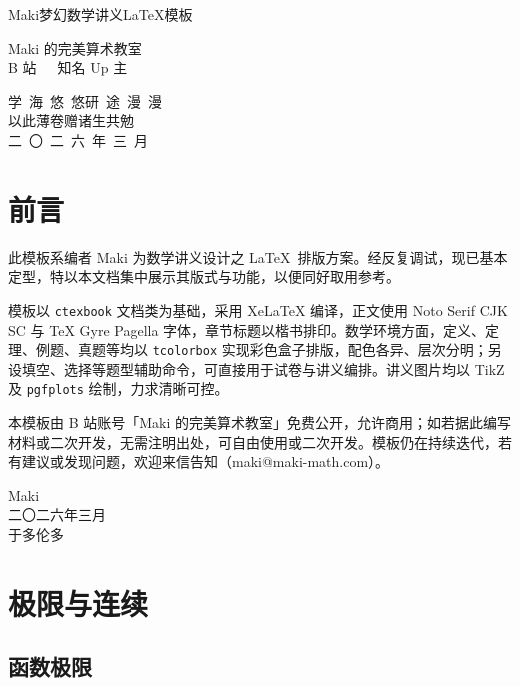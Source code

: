 \documentclass[a4paper,12pt,oneside,fontset=none]{ctexbook}
\newcommand{\MakeTitlePage}{%
    \begin{titlepage}
        \centering
        \vspace*{5cm}
        
        {\fontsize{48pt}{60pt}\selectfont\heavykaishu \color{LogicColor} Maki梦幻数学讲义LaTeX模板\par}
        
        \vfill
        
        {\LARGE \kaishu 
        Maki 的完美算术教室
        \\[0.8em]
        \Large
        B 站\ \ \ 知名 Up 主
        \\
        }
    
        \vspace{2.3cm}
        
        {\Large \kaishu
        学\ 海\ 悠\ 悠\quad 研\ 途\ 漫\ 漫
        \\[0.3em]
        {\Large 以此薄卷赠诸生共勉}
        \\[2.5em]
        
        二\ 〇\ 二\ 六\ 年\ 三\ 月 
        }
        
        \vspace{2cm}
    \end{titlepage}%
}
\numberwithin{equation}{chapter}
\begin{document}
\frontmatter

\MakeTitlePage



\chapter*{前言}
此模板系编者 Maki 为数学讲义设计之 \LaTeX\ 排版方案。经反复调试，现已基本定型，特以本文档集中展示其版式与功能，以便同好取用参考。

模板以 \texttt{ctexbook} 文档类为基础，采用 XeLaTeX 编译，正文使用 Noto Serif CJK SC 与 TeX Gyre Pagella 字体，章节标题以楷书排印。数学环境方面，定义、定理、例题、真题等均以 \texttt{tcolorbox} 实现彩色盒子排版，配色各异、层次分明；另设填空、选择等题型辅助命令，可直接用于试卷与讲义编排。讲义图片均以 TikZ 及 \texttt{pgfplots} 绘制，力求清晰可控。

本模板由 B 站账号「Maki 的完美算术教室」免费公开，允许商用；如若据此编写材料或二次开发，无需注明出处，可自由使用或二次开发。模板仍在持续迭代，若有建议或发现问题，欢迎来信告知（maki@maki-math.com）。

\vspace{3cm}

\hfill
\begin{minipage}{5cm}
    \centering
    Maki \\
    二〇二六年三月\\
    于多伦多
\end{minipage}



 
\tableofcontents


\mainmatter








\chapter{极限与连续}

\section{函数极限}
\end{document}
